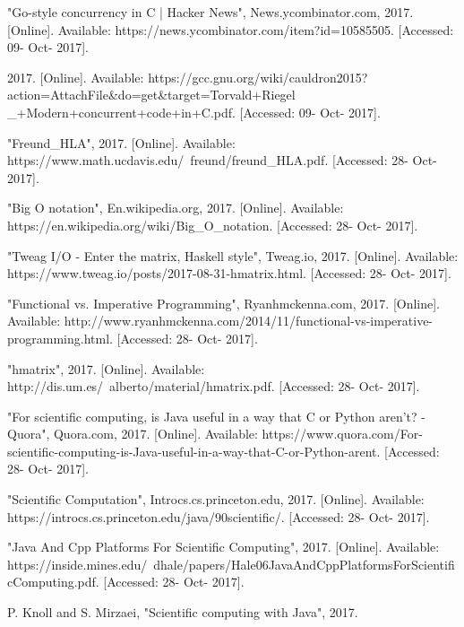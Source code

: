 \documentclass[conference]{IEEEtran}
\begin{document}
\begin{thebibliography}{00}
 "Go-style concurrency in C | Hacker News", News.ycombinator.com, 2017. [Online]. Available: https://news.ycombinator.com/item?id=10585505. [Accessed: 09- Oct- 2017].

 2017. [Online]. Available: https://gcc.gnu.org/wiki/cauldron2015?
action=AttachFile\&do=get\&target=Torvald+Riegel
\_+Modern+concurrent+code+in+C.pdf. [Accessed: 09- Oct- 2017].

 "Freund\_HLA", 2017. [Online]. Available: https://www.math.ucdavis.edu/~freund/freund\_HLA.pdf. [Accessed: 28- Oct- 2017].

 "Big O notation", En.wikipedia.org, 2017. [Online]. Available: https://en.wikipedia.org/wiki/Big\_O\_notation. [Accessed: 28- Oct- 2017].

 "Tweag I/O - Enter the matrix, Haskell style", Tweag.io, 2017. [Online]. Available: https://www.tweag.io/posts/2017-08-31-hmatrix.html. [Accessed: 28- Oct- 2017].

 "Functional vs. Imperative Programming", Ryanhmckenna.com, 2017. [Online]. Available: http://www.ryanhmckenna.com/2014/11/functional-vs-imperative-programming.html. [Accessed: 28- Oct- 2017].

 "hmatrix", 2017. [Online]. Available: http://dis.um.es/~alberto/material/hmatrix.pdf. [Accessed: 28- Oct- 2017].

 "For scientific computing, is Java useful in a way that C or Python aren't? - Quora", Quora.com, 2017. [Online]. Available: https://www.quora.com/For-scientific-computing-is-Java-useful-in-a-way-that-C-or-Python-arent. [Accessed: 28- Oct- 2017].

 "Scientific Computation", Introcs.cs.princeton.edu, 2017. [Online]. Available: https://introcs.cs.princeton.edu/java/90scientific/. [Accessed: 28- Oct- 2017].

 "Java And Cpp Platforms For Scientific Computing", 2017. [Online]. Available: https://inside.mines.edu/~dhale/papers/Hale06JavaAndCppPlatformsForScientificComputing.pdf. [Accessed: 28- Oct- 2017].

 P. Knoll and S. Mirzaei, "Scientific computing with Java", 2017.

\end{thebibliography}
\end{document}
